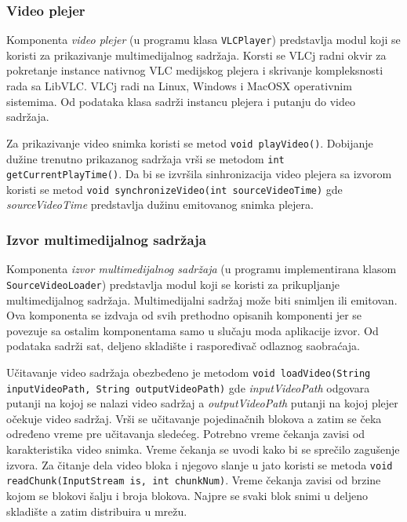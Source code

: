 \documentclass[12pt,oneside]{memoir}
\begin{document}
\subsubsection{Video plejer}
\label{implementacija.2.3.8}

Komponenta \textit{video plejer} (u programu klasa \texttt{VLCPlayer}) predstavlja modul koji se koristi za prikazivanje multimedijalnog sadržaja. Korsti se VLCj radni okvir za pokretanje instance nativnog VLC medijskog plejera i skrivanje kompleksnosti rada sa LibVLC. VLCj radi na Linux, Windows i MacOSX operativnim sistemima. Od podataka klasa sadrži instancu plejera i putanju do video sadržaja. 

Za prikazivanje video snimka koristi se metod \texttt{void playVideo()}. Dobijanje dužine trenutno prikazanog sadržaja vrši se metodom
\texttt{int getCurrentPlayTime()}.
 Da bi se izvršila sinhronizacija video plejera sa izvorom koristi se metod \texttt{void synchronizeVideo(int sourceVideoTime)} gde \textit{sourceVideoTime} predstavlja dužinu emitovanog snimka plejera.


\subsubsection{Izvor multimedijalnog sadržaja}
\label{implementacija.2.3.9}
Komponenta \textit{izvor multimedijalnog sadržaja} (u programu implementirana klasom \texttt{SourceVideoLoader}) predstavlja modul koji se koristi za prikupljanje multimedijalnog sadržaja. Multimedijalni sadržaj može biti snimljen ili emitovan. Ova komponenta se izdvaja od svih prethodno opisanih komponenti jer se povezuje sa ostalim komponentama samo u slučaju moda aplikacije izvor. Od podataka sadrži sat, deljeno skladište i raspoređivač odlaznog saobraćaja.

Učitavanje video sadržaja obezbeđeno je metodom \texttt{void loadVideo(String \\inputVideoPath, String outputVideoPath)} gde \textit{inputVideoPath} odgovara putanji na kojoj se nalazi video sadržaj a \textit{outputVideoPath} putanji na kojoj plejer očekuje video sadržaj. Vrši se učitavanje pojedinačnih blokova a zatim se čeka određeno vreme pre učitavanja sledećeg.
Potrebno vreme čekanja zavisi od karakteristika video snimka. Vreme čekanja se uvodi kako bi se sprečilo zagušenje izvora.
Za čitanje dela video bloka i njegovo slanje u jato koristi se metoda \texttt{void readChunk(InputStream is, int chunkNum)}.  Vreme čekanja zavisi od brzine kojom se blokovi šalju i broja blokova. Najpre se svaki blok snimi u deljeno skladište a zatim distribuira u mrežu.
\end{document}
